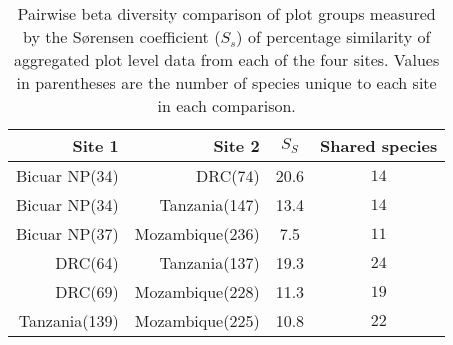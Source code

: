 
\begin{table}[!htbp] \centering 
  	\caption[Pairwise S\o{}rensen coefficient of similarity among sites]{Pairwise beta diversity comparison of plot groups measured by the S\o{}rensen coefficient ($S_s$) of percentage similarity of aggregated plot level data from each of the four sites. Values in parentheses are the number of species unique to each site in each comparison.} 
  \label{bicuar:site_pairs_js} 
\begin{tabular}{rrcc} 
	\hline
Site 1 & Site 2 & $S_{S}$ & Shared species \\
	\hline
Bicuar NP(34) & DRC(74) & 20.6 & $14$ \\ 
Bicuar NP(34) & Tanzania(147) & 13.4 & $14$ \\ 
Bicuar NP(37) & Mozambique(236) & 7.5 & $11$ \\ 
DRC(64) & Tanzania(137) & 19.3 & $24$ \\ 
DRC(69) & Mozambique(228) & 11.3 & $19$ \\ 
Tanzania(139) & Mozambique(225) & 10.8 & $22$ \\ 
	\hline
\end{tabular} 
\end{table} 
